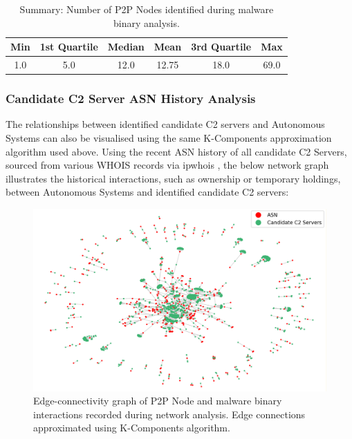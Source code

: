 \begin{table}[!htb]
    \centering
    \caption{Summary: Number of P2P Nodes identified during malware binary analysis.}
    \label{tab:p2p_payload_summary}
    \begin{tabular}{|c|c|c|c|c|c|}
    \hline
    \textbf{Min} & \textbf{1st Quartile} & \textbf{Median} & \textbf{Mean} & \textbf{3rd Quartile} & \textbf{Max} \\ \hline
    1.0 & 5.0 & 12.0 & 12.75 & 18.0 & 69.0 \\ \hline
    \end{tabular}
\end{table}

\subsubsection{Candidate C2 Server ASN History Analysis} The relationships between identified candidate C2 servers and Autonomous Systems can also be visualised using the same K-Components approximation algorithm used above. Using  the recent ASN history of all candidate C2 Servers, sourced from various WHOIS records via ipwhois \citep{ipwhois}, the below network graph illustrates the historical interactions, such as ownership or temporary holdings, between Autonomous Systems and identified candidate C2 servers:

\begin{figure}[!htb]
    \centering
    \includegraphics[width=0.9\linewidth]{results/c2_asn_network.png}
    \caption{Edge-connectivity graph of P2P Node and malware binary interactions recorded during network analysis. Edge connections approximated using K-Components algorithm.}
    \label{fig:c2_asn_networks} 
\end{figure}

